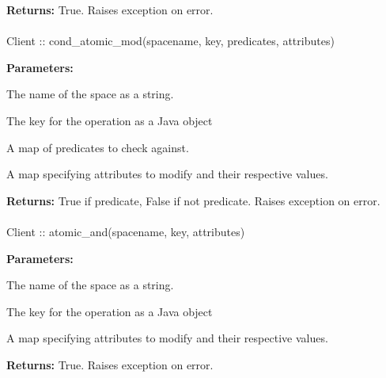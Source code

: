 \noindent\textbf{Returns:}
True.  Raises exception on error.

\paragraph{}
\label{api:java:cond_atomic_mod}
\begin{javacode}
Client :: cond_atomic_mod(spacename, key, predicates, attributes)
\end{javacode}


\noindent\textbf{Parameters:}
\begin{description}[labelindent=\widthof{{\code{predicates}}},leftmargin=*,noitemsep,nolistsep,align=right]
\item[\code{spacename}] The name of the space as a string.
\item[\code{key}] The key for the operation as a Java object
\item[\code{predicates}] A map of predicates to check against.
\item[\code{attributes}] A map specifying attributes to modify and their respective values.
\end{description}

\noindent\textbf{Returns:}
True if predicate, False if not predicate.  Raises exception on error.

\paragraph{}
\label{api:java:atomic_and}
\begin{javacode}
Client :: atomic_and(spacename, key, attributes)
\end{javacode}


\noindent\textbf{Parameters:}
\begin{description}[labelindent=\widthof{{\code{attributes}}},leftmargin=*,noitemsep,nolistsep,align=right]
\item[\code{spacename}] The name of the space as a string.
\item[\code{key}] The key for the operation as a Java object
\item[\code{attributes}] A map specifying attributes to modify and their respective values.
\end{description}

\noindent\textbf{Returns:}
True.  Raises exception on error.

